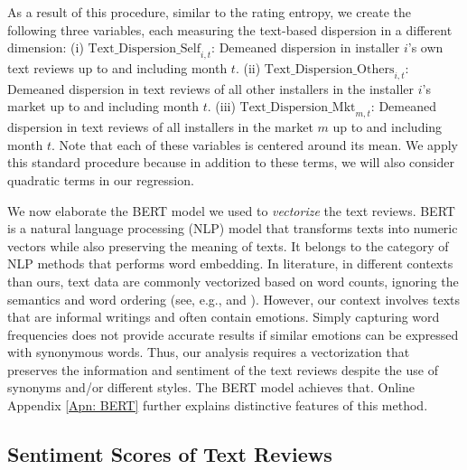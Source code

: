 \documentclass[mnsc,blindrev]{informs3}
\begin{document}
	As a result of this procedure, similar to the rating entropy, we create the following three variables, each measuring the text-based dispersion in a different dimension: (i) $\text{Text\_Dispersion\_Self}_{i,t}$: Demeaned dispersion in installer $i$'s own text reviews up to and including month $t$. %
	(ii) $\text{Text\_Dispersion\_Others}_{i,t}$: Demeaned dispersion in text reviews of all other installers in the installer $i$'s market up to and including month $t$. %
	(iii) $\text{Text\_Dispersion\_Mkt}_{m,t}$: Demeaned dispersion in text reviews of all installers in the market $m$ up to and including month $t$. %
	Note that each of these variables is centered around its mean. We apply this standard procedure because in addition to these terms, we will also consider quadratic terms in our regression.
	
	We now elaborate the BERT model we used to \textit{vectorize} the text reviews. BERT is a natural language processing (NLP) model that transforms texts into numeric vectors while also preserving the meaning of texts. It belongs to the category of NLP methods that performs word embedding. In literature, in different contexts than ours, text data are commonly vectorized based on word counts, ignoring the semantics and word ordering (see, e.g., \cite{hoberg2016text} and \cite{loughran2011liability}). However, our context involves texts that are informal writings and often contain emotions. Simply capturing word frequencies does not provide accurate results if similar emotions can be expressed with synonymous words.  Thus, our analysis requires a vectorization that preserves the information and sentiment of the text reviews despite the use of synonyms and/or different styles. The BERT model achieves that. Online Appendix \ref{Apn: BERT} further explains distinctive features of this method.
	

	
	\subsection{Sentiment Scores of Text Reviews} \label{Subsec: Sentiment}
	
\end{document}

